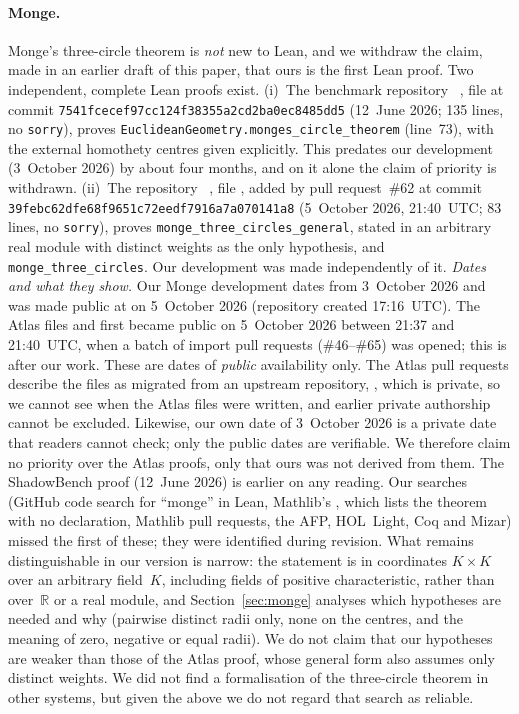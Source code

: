 \documentclass[11pt]{article}
\theoremstyle{definition}
\theoremstyle{remark}
\newcommand{\lean}[1]{\texttt{#1}}
\newcommand{\RR}{\mathbb{R}}
\begin{document}
\paragraph{Monge.} Monge's three-circle theorem is \emph{not} new to Lean, and we withdraw the
claim, made in an earlier draft of this paper, that ours is the first Lean proof. Two
independent, complete Lean proofs exist. (i)~The benchmark repository
~\cite{ShadowBench}, file
 at commit
\texttt{7541fcecef97cc124f38355a2cd2ba0ec8485dd5} (12~June 2026; 135 lines, no \lean{sorry}),
proves \lean{EuclideanGeometry.monges\_circle\_theorem} (line~73), with the external homothety
centres given explicitly. This predates our development (3~October 2026) by about four months,
and on it alone the claim of priority is withdrawn.
(ii)~The repository ~\cite{AtlasLean}, file
, added by pull request~\#62 at commit
\texttt{39febc62dfe68f9651c72eedf7916a7a070141a8} (5~October 2026, 21:40~UTC; 83 lines, no
\lean{sorry}), proves \lean{monge\_three\_circles\_general}, stated in an arbitrary
real module with distinct weights as the only hypothesis, and \lean{monge\_three\_circles}. Our
development was made independently of it.
\emph{Dates and what they show.} Our Monge development dates from 3~October 2026 and was made
public at  on 5~October 2026 (repository created 17:16~UTC). The
Atlas files  and  first became public on
5~October 2026 between 21:37 and 21:40~UTC, when a batch of import pull requests (\#46--\#65) was
opened; this is after our work. These are dates of \emph{public} availability only. The Atlas
pull requests describe the files as migrated from an upstream repository,
, which is private, so we cannot see when the Atlas files were
written, and earlier private authorship cannot be excluded. Likewise, our own date of
3~October 2026 is a private date that readers cannot check; only the public dates are
verifiable. We therefore claim no priority over the Atlas proofs, only that ours was not derived
from them. The ShadowBench proof (12~June 2026) is earlier on any reading. Our searches
(GitHub code search for ``monge'' in Lean, Mathlib's , which lists the
theorem with no declaration, Mathlib pull requests, the AFP, HOL~Light, Coq and Mizar) missed the
first of these; they were identified during revision. What remains distinguishable in our version
is narrow: the statement is in coordinates $K\times K$ over an arbitrary field~$K$, including
fields of positive characteristic, rather than over~$\RR$ or a real module, and
Section~\ref{sec:monge} analyses which hypotheses are needed and why (pairwise distinct radii only,
none on the centres, and the meaning of zero, negative or equal radii). We do not claim that our
hypotheses are weaker than those of the Atlas proof, whose general form also assumes only distinct
weights. We did not find a formalisation of the three-circle theorem in other systems, but given
the above we do not regard that search as reliable.
\end{document}

